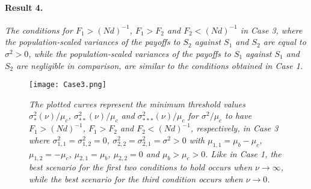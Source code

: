 \documentclass[11pt]{article}
\begin{document}
\paragraph{Result 4.}
\textit{
The conditions for $F_1>(Nd)^{-1}$, $F_1 > F_2$ and $F_2<(Nd)^{-1}$  in Case 3, where
 the population-scaled variances  of the payoffs to $S_2$ against $S_1$ and $S_2$ are equal to $\sigma^2>0$, while the population-scaled variances  of the payoffs to $S_1$ against $S_1$ and $S_2$ are negligible in comparison, are similar to the conditions obtained in Case 1.
}


\begin{figure}[hbt!]
\texttt{[image: Case3.png]}
\caption{\textit{The plotted curves represent the minimum threshold values $\sigma^2_{*}(\nu)/\mu_c$, $\sigma^2_{**}(\nu)/\mu_c$ and $\sigma^2_{***}(\nu)/\mu_c$ for $\sigma_{}^2/\mu_c$ to have $F_1>(Nd)^{-1}$, $F_1 > F_2$ and  $F_2<(Nd)^{-1}$, respectively, in  Case 3 where $\sigma^2_{1,1}=\sigma^2_{1,2}=0$, $\sigma^2_{2,2}=\sigma^2_{2,1}=\sigma^2>0$ with $\mu_{1,1}=\mu_b-\mu_c$, $\mu_{1,2}=-\mu_c$, $\mu_{2,1}=\mu_b$, $\mu_{2,2}=0$ and $\mu_b>\mu_c>0$. 
Like in Case 1, the best scenario for the first two conditions to hold occurs when $\nu\rightarrow\infty$, while the best scenario for the third condition occurs when $\nu\rightarrow0$.}
}
\label{figure3}
\end{figure}
\end{document}
